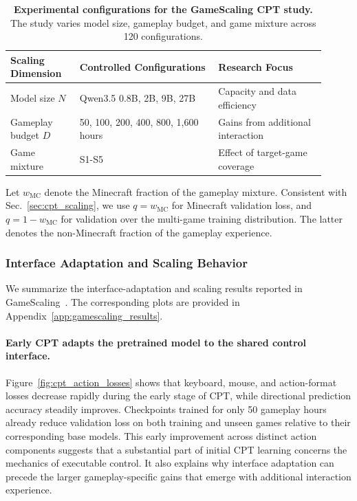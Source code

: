 \begin{table}[t]
    \centering
    \small
    \setlength{\tabcolsep}{4pt}
    \renewcommand{\arraystretch}{1.08}
    \begin{tabular}{p{0.20\linewidth}p{0.40\linewidth}p{0.31\linewidth}}
        \toprule
        \textbf{Scaling Dimension}
        & \textbf{Controlled Configurations}
        & \textbf{Research Focus} \\
        \midrule
        Model size $N$
        & Qwen3.5 0.8B, 2B, 9B, 27B
        & Capacity and data efficiency \\
        
        Gameplay budget $D$
        & 50, 100, 200, 400, 800, 1,600 hours
        & Gains from additional interaction \\
        
        Game mixture
        & S1-S5
        & Effect of target-game coverage \\
        \bottomrule
    \end{tabular}
    \caption{
    \textbf{Experimental configurations for the GameScaling CPT study.} The study varies model size, gameplay budget, and game mixture across 120 configurations.
    }
    \label{tab:cpt_scaling_setup}
\end{table}


Let $w_{\mathrm{MC}}$ denote the Minecraft fraction of the gameplay mixture.
Consistent with Sec.~\ref{sec:cpt_scaling}, we use
$q=w_{\mathrm{MC}}$
for Minecraft validation loss, and
$q=1-w_{\mathrm{MC}}$
for validation over the multi-game training distribution.
The latter denotes the non-Minecraft fraction of the gameplay experience.


\subsubsection{Interface Adaptation and Scaling Behavior}

We summarize the interface-adaptation and scaling results reported in GameScaling~\cite{gamescaling}. The corresponding plots are provided in Appendix~\ref{app:gamescaling_results}.

\paragraph{Early CPT adapts the pretrained model to the shared control interface.}
Figure~\ref{fig:cpt_action_losses} shows that keyboard, mouse, and action-format losses decrease rapidly during the early stage of CPT, while directional prediction accuracy steadily improves.
Checkpoints trained for only 50 gameplay hours already reduce validation loss on both training and unseen games relative to their corresponding base models. This early improvement across distinct action components suggests that a substantial part of initial CPT learning concerns the mechanics of executable control. It also explains why interface adaptation can precede the larger gameplay-specific gains that emerge with additional interaction experience.



